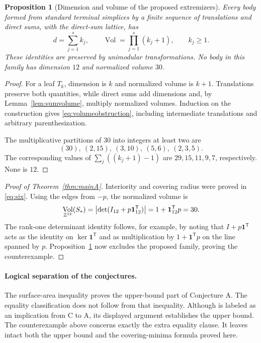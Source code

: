 \documentclass[11pt,a4paper]{article}
\newtheorem{proposition}[theorem]{Proposition}
\theoremstyle{definition}\newtheorem{definition}[theorem]{Definition}
\theoremstyle{remark}\newtheorem{remark}[theorem]{Remark}
\DeclareMathOperator{\Vol}{Vol}
\newcommand{\one}{\mathbf1}
\begin{document}
\begin{proposition}[Dimension and volume of the proposed extremizers]
\label{prop:terminalvolume}
Every body formed from standard terminal simplices by a finite
sequence of translations and direct sums, with the direct-sum
lattice, has
\begin{equation}\label{eq:volumeobstruction}
 d=\sum_{j=1}^s k_j,\qquad
 \Vol=\prod_{j=1}^s(k_j+1),\qquad k_j\ge1.
\end{equation}
These identities are preserved by unimodular transformations.
No body in this family has dimension $12$ and normalized volume $30$.
\end{proposition}
\begin{proof}
For a leaf $T_k$, dimension is $k$ and normalized volume is $k+1$.
Translations preserve both quantities, while direct sums add
dimensions and, by Lemma~\ref{lem:sumvolume}, multiply normalized
volumes. Induction on the construction gives
\eqref{eq:volumeobstruction}, including intermediate translations
and arbitrary parenthesization.

The multiplicative partitions of $30$ into integers at least two
are
\[
 (30),\ (2,15),\ (3,10),\ (5,6),\ (2,3,5).
\]
The corresponding values of $\sum_j((k_j+1)-1)$ are
$29,15,11,9,7$, respectively. None is $12$.
\end{proof}

\begin{proof}[Proof of Theorem~\ref{thm:mainA}]
Interiority and covering radius were proved in
\eqref{eq:six}. Using the edges from $-p$, the normalized volume is
\[
 \Vol_{\Z^{12}}(S_*)
 =\left|\det(I_{12}+p\one_{12}^{\mathsf T})\right|
 =1+\one_{12}^{\mathsf T}p=30.
\]
The rank-one determinant identity follows, for example, by noting
that $I+p\one^{\mathsf T}$ acts as the identity on
$\ker\one^{\mathsf T}$ and as multiplication by
$1+\one^{\mathsf T}p$ on the line spanned by $p$.
Proposition~\ref{prop:terminalvolume} now excludes the proposed
family, proving the counterexample.
\end{proof}

\paragraph{Logical separation of the conjectures.}
The surface-area inequality proves the upper-bound part of
Conjecture A. The equality classification does not follow from that
inequality. Although \cite[Corollary 4.3]{CSS} is labeled as an
implication from C to A, its displayed argument establishes the
upper bound. The counterexample above concerns exactly the extra
equality clause. It leaves intact both the upper bound and the
covering-minima formula proved here.
\end{document}
